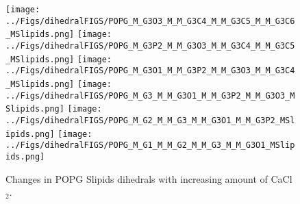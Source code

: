 \documentclass[journal=jpcbfk]{achemso}
\begin{document}

\begin{figure}[]
  \centering
  \texttt{[image: ../Figs/dihedralFIGS/POPG\_M\_G3O3\_M\_M\_G3C4\_M\_M\_G3C5\_M\_M\_G3C6\_MSlipids.png]}
  \texttt{[image: ../Figs/dihedralFIGS/POPG\_M\_G3P2\_M\_M\_G3O3\_M\_M\_G3C4\_M\_M\_G3C5\_MSlipids.png]}
  \texttt{[image: ../Figs/dihedralFIGS/POPG\_M\_G3O1\_M\_M\_G3P2\_M\_M\_G3O3\_M\_M\_G3C4\_MSlipids.png]}
  \texttt{[image: ../Figs/dihedralFIGS/POPG\_M\_G3\_M\_M\_G3O1\_M\_M\_G3P2\_M\_M\_G3O3\_MSlipids.png]}
  \texttt{[image: ../Figs/dihedralFIGS/POPG\_M\_G2\_M\_M\_G3\_M\_M\_G3O1\_M\_M\_G3P2\_MSlipids.png]}
  \texttt{[image: ../Figs/dihedralFIGS/POPG\_M\_G1\_M\_M\_G2\_M\_M\_G3\_M\_M\_G3O1\_MSlipids.png]}  
  \caption{\label{DIHSwithCAslipidsPOPG}
    Changes in POPG Slipids dihedrals with increasing amount of CaCl$_2$.
  }
\end{figure}

\end{document}
